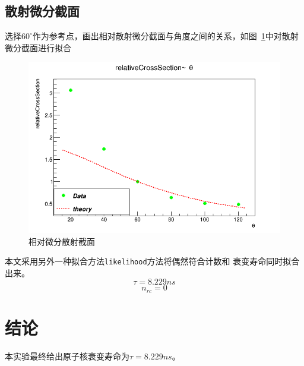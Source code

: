 \documentclass[10pt]{ctexart}
\begin{document}
\subsection{散射微分截面}
选择$60^\circ$作为参考点，画出相对散射微分截面与角度之间的关系，如图~\ref{fig:fit}中对散射微分截面进行拟合
\begin{figure}[htbp]
    \centering
    \includegraphics[width=\textwidth]{data/scatterPBarn.png}
    \caption{相对微分散射截面}
    \label{fig:fit}
\end{figure}
本文采用另外一种拟合方法\texttt{likelihood}方法将偶然符合计数和
衰变寿命同时拟合出来。
\[\tau=8.229ns\]
\[n_{rc}=0\]
\section{结论}
本实验最终给出原子核衰变寿命为$\tau=8.229ns$。

\end{document}
